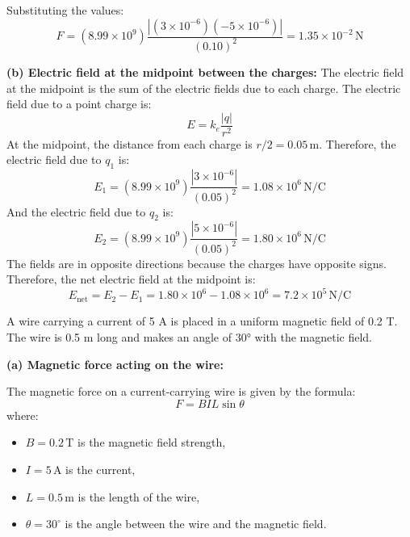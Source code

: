 \documentclass[addpoints]{exam}
\begin{document}
\begin{questions}
\begin{solution}[8cm]
Substituting the values:
\[
F = (8.99 \times 10^9) \frac{|(3 \times 10^{-6}) (-5 \times 10^{-6})|}{(0.10)^2} = 1.35 \times 10^{-2} \, \text{N}
\]

\textbf{(b) Electric field at the midpoint between the charges:}  
The electric field at the midpoint is the sum of the electric fields due to each charge. The electric field due to a point charge is:
\[
E = k_e \frac{|q|}{r^2}
\]
At the midpoint, the distance from each charge is \( r/2 = 0.05 \, \text{m} \). Therefore, the electric field due to \( q_1 \) is:
\[
E_1 = (8.99 \times 10^9) \frac{|3 \times 10^{-6}|}{(0.05)^2} = 1.08 \times 10^6 \, \text{N/C}
\]
And the electric field due to \( q_2 \) is:
\[
E_2 = (8.99 \times 10^9) \frac{|5 \times 10^{-6}|}{(0.05)^2} = 1.80 \times 10^6 \, \text{N/C}
\]
The fields are in opposite directions because the charges have opposite signs. Therefore, the net electric field at the midpoint is:
\[
E_{\text{net}} = E_2 - E_1 = 1.80 \times 10^6 - 1.08 \times 10^6 = 7.2 \times 10^5 \, \text{N/C}
\]
\end{solution}



\question A wire carrying a current of 5 A is placed in a uniform magnetic field of 0.2 T. The wire is 0.5 m long and makes an angle of 30° with the magnetic field.
\begin{solution}[11.5cm]
\textbf{(a) Magnetic force acting on the wire:}  

The magnetic force on a current-carrying wire is given by the formula:
\[
F = B I L \sin \theta
\]
where:
\begin{itemize}
    \item \( B = 0.2 \, \text{T} \) is the magnetic field strength,
    \item \( I = 5 \, \text{A} \) is the current,
    \item \( L = 0.5 \, \text{m} \) is the length of the wire,
    \item \( \theta = 30^\circ \) is the angle between the wire and the magnetic field.
\end{itemize}


\end{solution}
\end{questions}
\end{document}
